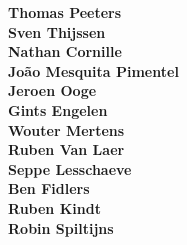 \begin{multicols}{2}
\textbf{Thomas Peeters}\\
\textbf{Sven Thijssen}\\
\textbf{Nathan Cornille}\\
\textbf{Jo\~{a}o Mesquita Pimentel}\\
\textbf{Jeroen Ooge}\\
\textbf{Gints Engelen}\\
\textbf{Wouter Mertens}\\
\textbf{Ruben Van Laer}\\
\textbf{Seppe Lesschaeve}\\
\textbf{Ben Fidlers}\\
\textbf{Ruben Kindt}\\
\textbf{Robin Spiltijns}\\
\end{multicols}
